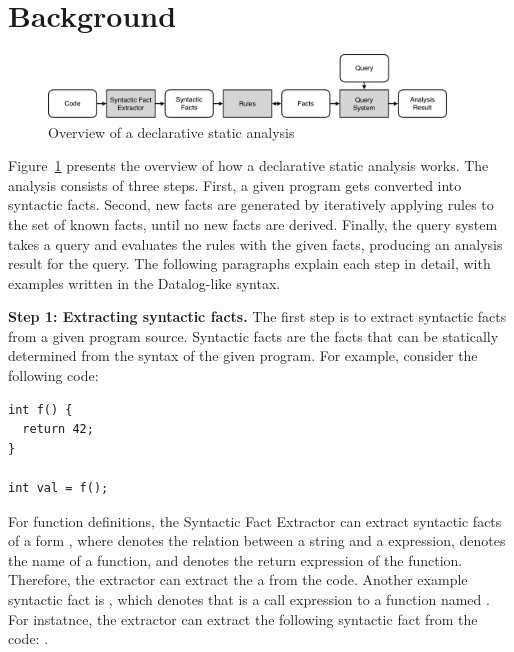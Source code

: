 \section{Background}\label{sec:background} 
\begin{figure}[t]
  \centering
  \vspace{2mm}
  \includegraphics[width=0.94\textwidth]{img/ov1.pdf}
  \caption{Overview of a declarative static analysis}
  \label{fig:ov1}
\end{figure}

Figure~\ref{fig:ov1} presents the overview of how a declarative static
analysis works.  The analysis consists of three steps.  First, a given program
gets converted into syntactic facts. 
Second, new facts are generated by iteratively applying rules to the set of
known facts, until no new facts are derived.  
Finally, the query system takes a query and evaluates the rules with the given
facts, producing an analysis result for the query. 
The following paragraphs explain each step in detail, with examples written in
the Datalog-like syntax.


\textbf{Step 1: Extracting syntactic facts.}
The first step is to extract syntactic facts from a given program source.
Syntactic facts are the facts that can be statically determined
from the syntax of the given program.
For example, consider the following code:

\begin{lstlisting}[style=mcpp]
int f() {
  return 42;
}

int val = f();
\end{lstlisting}

For function definitions, the Syntactic Fact Extractor can extract syntactic
facts of a form , where 
denotes the relation between a string and a expression, 
denotes the name of a function, and  denotes the return
expression of the function.
Therefore, the extractor can extract the a  from the
code.  
Another example syntactic fact is , which
denotes that  is a call expression to a function named
.
For instatnce, the extractor can extract the following syntactic fact from the
code: .

